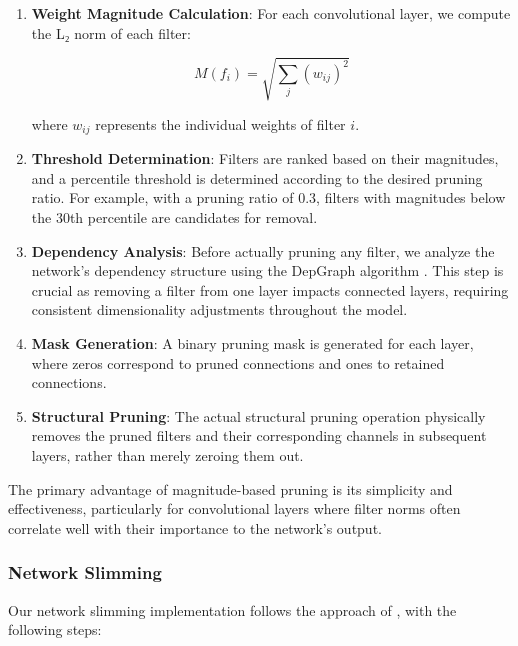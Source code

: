 \documentclass[12pt,a4paper]{article}
\begin{document}
\begin{enumerate}
\item \textbf{Weight Magnitude Calculation}: For each convolutional layer, we compute the L₂ norm of each filter:
   
   \begin{equation}
   M(f_i) = \sqrt{\sum_{j} (w_{ij})^2}
   \end{equation}
   
   where $w_{ij}$ represents the individual weights of filter $i$.

\item \textbf{Threshold Determination}: Filters are ranked based on their magnitudes, and a percentile threshold is determined according to the desired pruning ratio. For example, with a pruning ratio of 0.3, filters with magnitudes below the 30th percentile are candidates for removal.

\item \textbf{Dependency Analysis}: Before actually pruning any filter, we analyze the network's dependency structure using the DepGraph algorithm \cite{Fang2023DepGraph}. This step is crucial as removing a filter from one layer impacts connected layers, requiring consistent dimensionality adjustments throughout the model.

\item \textbf{Mask Generation}: A binary pruning mask is generated for each layer, where zeros correspond to pruned connections and ones to retained connections.

\item \textbf{Structural Pruning}: The actual structural pruning operation physically removes the pruned filters and their corresponding channels in subsequent layers, rather than merely zeroing them out.
\end{enumerate}

The primary advantage of magnitude-based pruning is its simplicity and effectiveness, particularly for convolutional layers where filter norms often correlate well with their importance to the network's output.

\subsubsection{Network Slimming}

Our network slimming implementation follows the approach of \cite{Liu2017Learning}, with the following steps:
\end{document}
